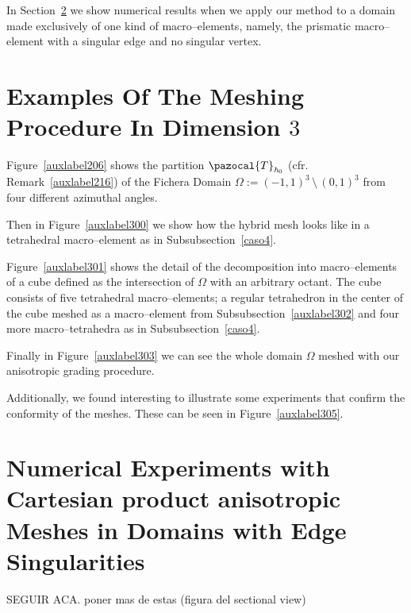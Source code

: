 In Section~\ref{auxlabel215} we show numerical results when we
apply our method to a domain made exclusively of one kind of macro--elements,
namely, the prismatic macro--element with a singular edge and no singular vertex.

\section{Examples Of The Meshing Procedure In Dimension $3$} %
\label{auxlabel214}
Figure~\ref{auxlabel206} shows the partition $\pazocal{T}_{\textit{h}_0}$ (cfr. Remark~\ref{auxlabel216}) of the Fichera Domain 
$\Omega:=(-1,1)^3\,\setminus\,(0,1)^3$ from four different azimuthal 
angles. 

\tauZero 

Then in Figure~\ref{auxlabel300} we show how the hybrid mesh 
looks like in a tetrahedral
macro--element as in Subsubsection~\ref{caso4}. 


Figure~\ref{auxlabel301} shows the detail of the decomposition into macro--elements
of a cube defined as the intersection of $\Omega$ with an arbitrary octant. The 
cube consists of five tetrahedral macro--elements; a regular tetrahedron
in the center of the cube meshed as a macro--element from 
Subsubsection~\ref{auxlabel302} and four more macro--tetrahedra as in 
Subsubsection~\ref{caso4}.

\tauOneEnCube

Finally in Figure~\ref{auxlabel303} we can see the whole domain $\Omega$
meshed with our anisotropic grading procedure.

\tauOneEn
\vspace{5cm}
Additionally, we found interesting to illustrate some experiments
that confirm the conformity of the meshes. These can be seen in 
Figure~\ref{auxlabel305}.

\conform
\newpage
\section{Numerical Experiments with Cartesian product anisotropic Meshes in Domains with Edge Singularities}
\label{auxlabel215}
\edgedomain
SEGUIR ACA. poner mas de estas (figura del sectional view)
\unifSection
\tableErrorsUniformCylinder
\tableErrorsAnisoCylinder


%
%